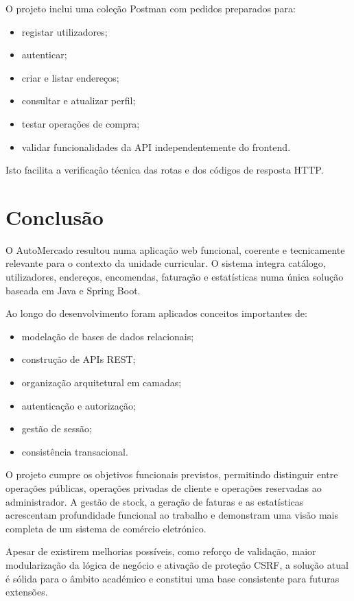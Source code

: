 \documentclass[10pt,a4paper]{report}
\begin{document}
O projeto inclui uma coleção Postman com pedidos preparados para:

\begin{itemize}
    \item registar utilizadores;
    \item autenticar;
    \item criar e listar endereços;
    \item consultar e atualizar perfil;
    \item testar operações de compra;
    \item validar funcionalidades da \ac{API} independentemente do frontend.
\end{itemize}

Isto facilita a verificação técnica das rotas e dos códigos de resposta \ac{HTTP}.

\chapter{Conclusão}
\label{chap:conclusao}

O AutoMercado resultou numa aplicação web funcional, coerente e tecnicamente relevante para o contexto da unidade curricular. O sistema integra catálogo, utilizadores, endereços, encomendas, faturação e estatísticas numa única solução baseada em Java e Spring Boot.

Ao longo do desenvolvimento foram aplicados conceitos importantes de:

\begin{itemize}
    \item modelação de bases de dados relacionais;
    \item construção de \ac{API}s \ac{REST};
    \item organização arquitetural em camadas;
    \item autenticação e autorização;
    \item gestão de sessão;
    \item consistência transacional.
\end{itemize}

O projeto cumpre os objetivos funcionais previstos, permitindo distinguir entre operações públicas, operações privadas de cliente e operações reservadas ao administrador. A gestão de stock, a geração de faturas e as estatísticas acrescentam profundidade funcional ao trabalho e demonstram uma visão mais completa de um sistema de comércio eletrónico.

Apesar de existirem melhorias possíveis, como reforço de validação, maior modularização da lógica de negócio e ativação de proteção \ac{CSRF}, a solução atual é sólida para o âmbito académico e constitui uma base consistente para futuras extensões.
\end{document}
